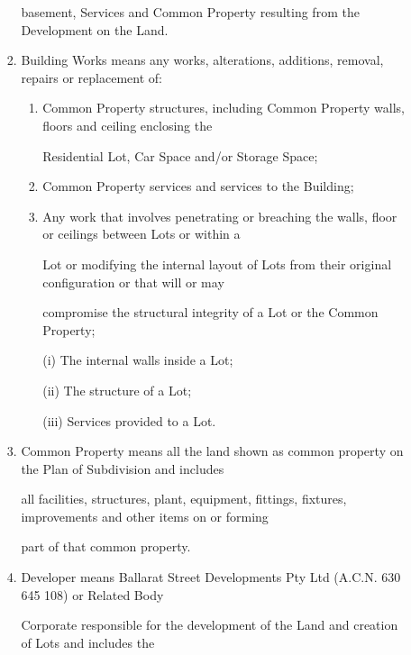 \documentclass{article}
\begin{document}
\begin{enumerate}[label=\arabic*.]
\begin{enumerate}[label=\arabic{enumi}.\arabic*.]
\begin{enumerate}[label=(\arabic*)]
{\fontsize{10.02}{1}basement, Services and Common Property resulting from the Development on the Land.  }

\item {\fontsize{9.962}{1} Building Works means any works, alterations, additions, removal, repairs or replacement of: }

\begin{enumerate}[label=(\alph*)]
\item {\fontsize{9.962}{1} Common Property structures, including Common Property walls, floors and ceiling enclosing the }

{\fontsize{10.02}{1}Residential Lot, Car Space and/or Storage Space; }

\item {\fontsize{9.962}{1} Common Property services and services to the Building; }

\item {\fontsize{9.962}{1} Any work that involves penetrating or breaching the walls, floor or ceilings between Lots or within a }

{\fontsize{10.02}{1}Lot or modifying the internal layout of Lots from their original configuration or that will or may }

{\fontsize{10.02}{1}compromise the structural integrity of a Lot or the Common Property; }

{\fontsize{9.962}{1}(i) The internal walls inside a Lot; }

\newpage

{\fontsize{9.962}{1}(ii) The structure of a Lot; }

{\fontsize{9.962}{1}(iii) Services provided to a Lot. }

\end{enumerate}
\item {\fontsize{9.962}{1} Common Property means all the land shown as common property on the Plan of Subdivision and includes }

{\fontsize{10.02}{1}all facilities, structures, plant, equipment, fittings, fixtures, improvements and other items on or forming }

{\fontsize{10.02}{1}part of that common property. }

\item {\fontsize{9.962}{1} Developer means Ballarat Street Developments Pty Ltd (A.C.N. 630 645 108) or Related Body }

{\fontsize{10.02}{1}Corporate responsible for the development of the Land and creation of Lots and includes the }


\end{enumerate}
\end{enumerate}
\end{enumerate}
\end{document}

